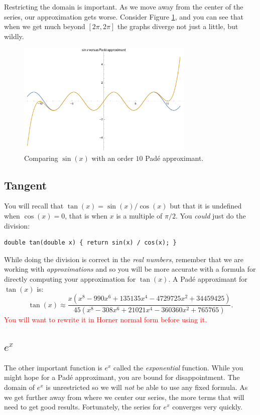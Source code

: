 \documentclass[11pt]{article}
\begin{document}
Restricting the domain is important. As we move away from the center
of the series, our approximation gets worse. Consider Figure
\ref{pade}, and you can see that when we get much beyond $[2\pi,2\pi]$
the graphs diverge not just a little, but wildly.

\begin{figure}[hbt]
\begin{centering}
\includegraphics[width=0.75\textwidth]{Pade}
\caption{Comparing $\sin(x)$ with an order $10$ Pad\'e approximant.}\label{pade}
\end{centering}
\end{figure}


\subsection{Tangent}
You will recall that $\tan(x) = {\sin(x)} / {\cos(x)}$ but
that it is undefined when $\cos(x) = 0$, that is when $x$ is a
multiple of ${\pi}/{2}$. You \emph{could} just do the division:
\begin{lstlisting}
double tan(double x) { return sin(x) / cos(x); }
\end{lstlisting}

While doing the division is correct in the \emph{real numbers},
remember that we are working with \emph{approximations} and so you will
be more accurate with a formula for directly computing your approximation
for $\tan(x)$.  A Pad\'e approximant for $\tan(x)$ is:
$$
\tan(x)\approx
\frac{x \left(x^8-990 x^6+135135 x^4-4729725 x^2+34459425\right)}{45 \left(x^8-308
   x^6+21021 x^4-360360 x^2+765765\right)} .
$$
\textcolor{red}{You will want to rewrite it in Horner normal form before using it.}

\subsection{\Large $e^x$}
The other important function is $e^x$ called the \emph{exponential}
function.  While you might hope for a Pad\'e approximant, you are
bound for disappointment.  The domain of $e^x$ is unrestricted so
we will \emph{not} be able to use any fixed formula.  As we get further
away from where we center our series, the more terms that will need
to get good results. Fortunately, the series for $e^x$ converges
very quickly.
\end{document}
